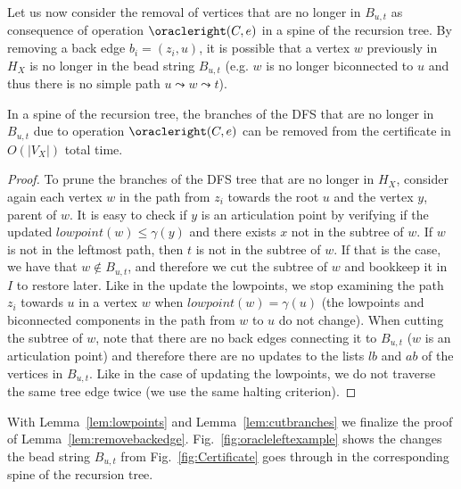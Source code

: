 Let us now consider the removal of vertices that
are no longer in $B_{u,t}$ as consequence of operation
$\oracleright(C,e)$ in a spine of the recursion tree. By removing a
back edge $b_i = (z_i,u)$, it is possible that a vertex $w$ previously
in $H_X$ is no longer in the bead string $B_{u,t}$ (e.g. $w$ is no
longer biconnected to $u$ and thus there is no simple path $u \leadsto
w \leadsto t$). 


\begin{lemma}
	In a spine of the recursion tree, the branches of the DFS that
	are no longer in $B_{u,t}$ due to operation
	$\oracleright(C,e)$ can be removed from the certificate in
	$O(|V_X|)$ total time.
	\label{lem:cutbranches}
\end{lemma}
\begin{proof}
	To prune the branches of the DFS tree that are no longer in
        $H_X$, consider again each vertex $w$ in the path from $z_i$
        towards the root $u$ and the vertex $y$, parent of $w$. It is
        easy to check if $y$ is an articulation point by verifying if
        the updated $\mathit{lowpoint}(w) \leq \gamma(y)$ and there
        exists $x$ not in the subtree of $w$. If $w$ is not in the
        leftmost path, then $t$ is not in the subtree of $w$. If that
        is the case, we have that $w \notin B_{u,t}$, and therefore we
        cut the subtree of $w$ and bookkeep it in $I$ to restore
        later. Like in the update the lowpoints, we stop examining the
        path $z_i$ towards $u$ in a vertex $w$ when
        $\mathit{lowpoint}(w) = \gamma(u)$ (the lowpoints and
        biconnected components in the path from $w$ to $u$ do not
        change).  When cutting the subtree of $w$, note that there are
        no back edges connecting it to $B_{u,t}$ ($w$ is an
        articulation point) and therefore there are no updates to the
        lists $lb$ and $ab$ of the vertices in $B_{u,t}$.  Like in the
        case of updating the lowpoints, we do not traverse the same
        tree edge twice (we use the same halting criterion). 
\end{proof}

With Lemma~\ref{lem:lowpoints} and Lemma~\ref{lem:cutbranches} we
finalize the proof of Lemma~\ref{lem:removebackedge}. 
Fig.~\ref{fig:oracleleftexample} shows the changes the bead string $B_{u,t}$
from Fig.~\ref{fig:Certificate} goes through in the corresponding spine
of the recursion tree.


